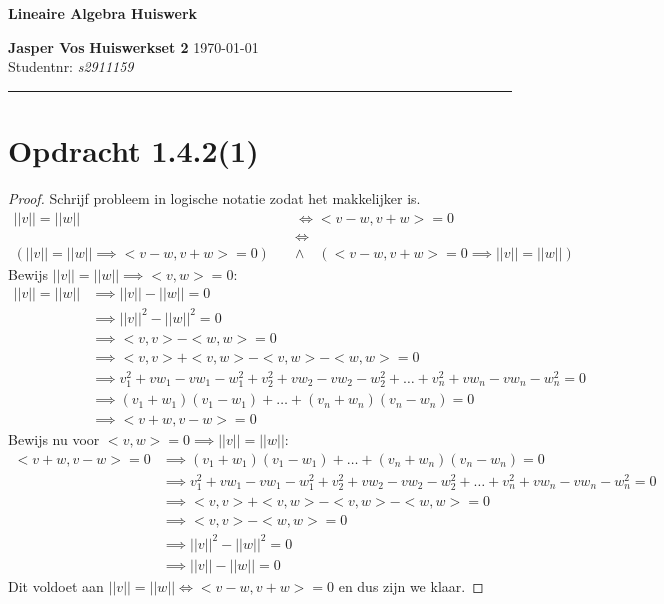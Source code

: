 \documentclass{article}
\begin{document}
{\Large \textbf{Lineaire Algebra Huiswerk}}

\bigskip

\textbf{Jasper Vos} \hfill \textbf{Huiswerkset 2} \hfill \today \\
Studentnr: \emph{s2911159} 

\rule{\textwidth}{2pt}

\bigskip

\section*{Opdracht 1.4.2(1)}
\begin{proof}
    Schrijf probleem in logische notatie zodat het makkelijker is.
    \begin{align*}
        ||v|| = ||w|| &\Leftrightarrow <v-w, v+w> = 0 \\
        &\Leftrightarrow \\
        (||v|| = ||w|| \implies <v-w, v+w> = 0) \quad &\wedge \quad (<v-w, v+w> = 0 \implies ||v|| = ||w||)
    \end{align*}
    Bewijs $||v|| = ||w|| \implies <v, w> = 0$:
    \begin{align*}
        \boxed{||v|| = ||w||} &\implies ||v|| - ||w|| = 0 \\
        &\implies ||v||^2 - ||w||^2 = 0 \\
        &\implies <v, v> - <w, w> = 0 \\
        &\implies <v, v> + <v, w> - <v, w> - <w, w> = 0 \\
        &\implies v_1^2 + vw_1 - vw_1 - w_1^2 + v_2^2 + vw_2 -vw_2 -w_2^2 + \dots + v_n^2 + vw_n - vw_n -w_n^2 = 0 \\
        &\implies (v_1 + w_1)(v_1 - w_1) + \dots + (v_n + w_n)(v_n - w_n) = 0 \\
        &\implies \boxed{<v+w, v-w> = 0}
    \end{align*}
    Bewijs nu voor $<v, w> = 0 \implies ||v|| = ||w||$:
    \begin{align*}
        \boxed{<v+w, v-w> = 0} &\implies (v_1 + w_1)(v_1 - w_1) + \dots + (v_n + w_n)(v_n - w_n) = 0 \\
        &\implies v_1^2 + vw_1 - vw_1 - w_1^2 + v_2^2 + vw_2 -vw_2 -w_2^2 + \dots + v_n^2 + vw_n - vw_n -w_n^2 = 0 \\
        &\implies <v, v> + <v, w> - <v, w> - <w, w> = 0 \\
        &\implies <v, v> - <w, w> = 0 \\
        &\implies ||v||^2 - ||w||^2 = 0 \\
        &\implies \boxed{||v|| - ||w|| = 0}
    \end{align*}
    Dit voldoet aan $||v|| = ||w|| \Leftrightarrow <v-w, v+w> = 0$ en dus zijn we klaar.
\end{proof}
\end{document}
